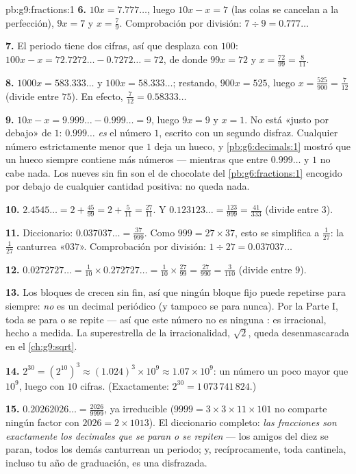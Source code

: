 \begin{solution}{pb:g9:fractions:1}
\textbf{6.} $10x = 7.777\ldots$, luego $10x - x = 7$ (las colas
se cancelan a la perfección), $9x = 7$ y $x = \frac79$. Comprobación por división:
$7 \div 9 = 0.777\ldots$

\textbf{7.} El periodo tiene dos cifras, así que desplaza con $100$:
$100x - x = 72.7272\ldots - 0.7272\ldots = 72$, de donde
$99x = 72$ y $x = \frac{72}{99} = \frac{8}{11}$.

\textbf{8.} $1000x = 583.333\ldots$ y $100x = 58.333\ldots$;
restando, $900x = 525$, luego
$x = \frac{525}{900} = \frac{7}{12}$ (divide entre $75$). En efecto,
$\frac{7}{12} = 0.58333\ldots$

\textbf{9.} $10x - x = 9.999\ldots - 0.999\ldots = 9$, luego
$9x = 9$ y $x = 1$. No está «justo por debajo» de $1$:
$0.999\ldots$ \emph{es} el número $1$, escrito con un segundo
disfraz. Cualquier número estrictamente menor que $1$ deja un hueco, y
\cref{pb:g6:decimals:1} mostró que un hueco siempre contiene más
números --- mientras que entre $0.999\ldots$ y $1$ no cabe nada.
Los nueves sin fin son el  de chocolate del
\cref{pb:g6:fractions:1} encogido por debajo de cualquier cantidad positiva:
no queda nada.

\textbf{10.} $2.4545\ldots = 2 + \frac{45}{99} = 2 +
\frac{5}{11} = \frac{27}{11}$. Y
$0.123123\ldots = \frac{123}{999} = \frac{41}{333}$ (divide entre
$3$).

\textbf{11.} Diccionario: $0.037037\ldots = \frac{37}{999}$.
Como $999 = 27 \times 37$, esto se simplifica a $\frac{1}{27}$:
la  $\frac{1}{27}$ canturrea «$037$». Comprobación por división:
$1 \div 27 = 0.037037\ldots$

\textbf{12.} $0.0272727\ldots = \frac{1}{10} \times
0.272727\ldots = \frac{1}{10} \times \frac{27}{99}
= \frac{27}{990} = \frac{3}{110}$ (divide entre $9$).

\textbf{13.} Los bloques de  crecen sin fin, así que ningún bloque
fijo puede repetirse para siempre: \emph{no} es un decimal periódico
(y tampoco se para nunca). Por la Parte I, toda  se para o
se repite --- así que este número no es ninguna : es
irracional, hecho a medida. La superestrella de la irracionalidad,
$\sqrt2$, queda desenmascarada en el \cref{ch:g9:sqrt}.

\textbf{14.} $2^{30} = \left(2^{10}\right)^3 \approx
(1.024)^3 \times 10^9 \approx 1.07 \times 10^9$: un número
un poco mayor que $10^9$, luego con $10$ cifras. (Exactamente:
$2^{30} = 1\,073\,741\,824$.)

\textbf{15.} $0.20262026\ldots = \frac{2026}{9999}$, ya
irreducible ($9999 = 3 \times 3 \times 11 \times 101$ no comparte
ningún factor con $2026 = 2 \times 1013$). El diccionario
completo: \emph{las fracciones son exactamente los decimales que
se paran o se repiten} --- los  amigos del diez se paran, todos
los demás canturrean un periodo; y, recíprocamente, toda cantinela, incluso tu
año de graduación, es una  disfrazada.
\end{solution}
